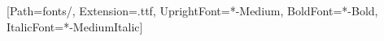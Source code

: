%

\usepackage{tikz}
\usepackage{eso-pic}

%

\newfontfamily{}[Path=fonts/, Extension=.ttf,
  UprightFont=*-Medium, BoldFont=*-Bold, ItalicFont=*-MediumItalic]

%
%
\newcommand{\korpDICIONARIO}{0.11217\paperwidth}   %
\newcommand{\korpSUBTITOLO} {0.06875\paperwidth}   %
\newcommand{\korpIDO}       {0.36908\paperwidth}   %
\newcommand{\korpNOMO}      {0.05247\paperwidth}   %

